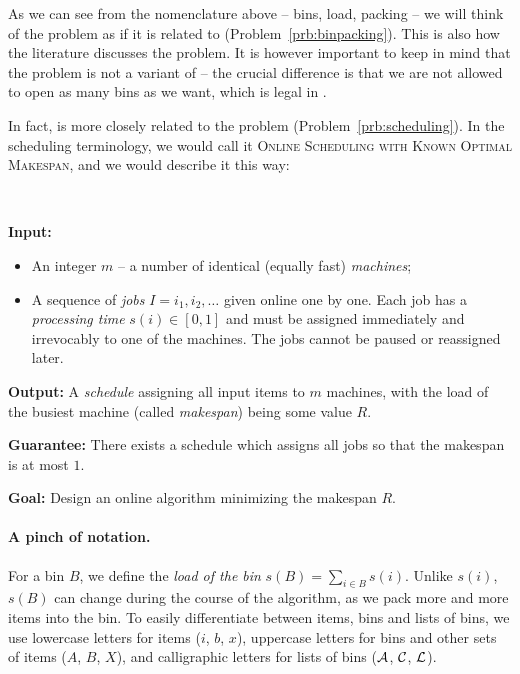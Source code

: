As we can see from the nomenclature above -- bins, load, packing -- we
will think of the problem as if it is related to \binpacking
(Problem~\ref{prb:binpacking}). This is also how the literature
discusses the problem.  It is however important to keep in mind that
the problem is not a variant of \binpacking -- the crucial difference
is that we are not allowed to open as many bins as we want, which is
legal in \binpacking.

In fact, \binstretch is more closely related to the problem \scheduling
(Problem~\ref{prb:scheduling}). In the scheduling terminology, we
would call it \textsc{Online Scheduling with Known Optimal Makespan},
and we would describe it this way:
\goodbreak

\begin{prb}~
\label{prb:binstretchscheduling}
\smallskip

\noindent\textbf{Input:}

\begin{itemize}
\item An integer $m$ -- a number of identical (equally fast) \emph{machines};
\item A sequence of \emph{jobs} $I=i_1, i_2, \ldots$ given online one by one. Each job has
a \textit{processing time} $s(i) \in [0,1]$ and must be assigned immediately and irrevocably
to one of the machines. The jobs cannot be paused or reassigned later.
\end{itemize}

\noindent
\textbf{Output:} A \emph{schedule} assigning all input items to $m$ machines, with the
load of the busiest machine (called \emph{makespan}) being some value
$R$.

\noindent
\textbf{Guarantee:} There exists a schedule which assigns all jobs so that
the makespan is at most $1$.

\noindent
\textbf{Goal:} Design an online algorithm minimizing the makespan $R$.
\smallskip
\end{prb}

\paragraph{A pinch of notation.} For a bin $B$, we define the
\textit{load of the bin} $s(B) = \sum_{i \in B} s(i)$. Unlike
$s(i)$, $s(B)$ can change during the course of the algorithm, as we
pack more and more items into the bin. To easily differentiate between
items, bins and lists of bins, we use lowercase letters for items
($i$, $b$, $x$), uppercase letters for bins and other sets of items
($A$, $B$, $X$), and calligraphic letters for lists of bins (${\mathcal A}$,
${\mathcal C}$, ${\mathcal L}$).

